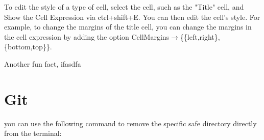 \documentclass[../../main.tex]{subfiles} %
\begin{document}
To edit the style of a type of cell, select the cell, such as the "Title" cell, and Show the Cell Expression via ctrl+shift+E. You can then edit the cell's style. For example, to change the margins of the title cell, you can change the margins in the cell expression by adding the option CellMargins$\rightarrow$\{\{left,right\},\{bottom,top\}\}.

Another fun fact, ifasdfa 

\section{Git}
you can use the following command to remove the specific safe directory directly from the terminal: 

\end{document}
